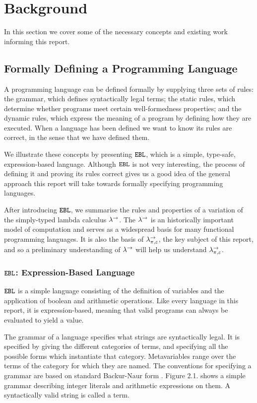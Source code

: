 \chapter{Background}\label{C:background}

In this section we cover some of the necessary concepts and existing work informing this report.

\section{Formally Defining a Programming Language}

A programming language can be defined formally by supplying three sets of rules: the grammar, which defines syntactically legal terms; the static rules, which determine whether programs meet certain well-formedness properties; and the dynamic rules, which express the meaning of a program by defining how they are executed. When a language has been defined we want to know its rules are correct, in the sense that we have defined them.

We illustrate these concepts by presenting $\mathtt{EBL}$, which is a simple, type-safe, expression-based language. Although $\mathtt{EBL}$ is not very interesting, the process of defining it and proving its rules correct gives us a good idea of the general approach this report will take towards formally specifying programming languages.

After introducing $\mathtt{EBL}$, we summarise the rules and properties of a variation of the simply-typed lambda calculus $\lambda^{\rightarrow}$. The $\lambda^{\rightarrow}$ is an historically important model of computation and serves as a widespread basis for many functional programming languages. It is also the basis of $\lambda^{\rightarrow}_{\pi, \varepsilon}$, the key subject of this report, and so a preliminary understanding of $\lambda^{\rightarrow}$ will help us understand $\lambda^{\rightarrow}_{\pi, \varepsilon}$.

\subsection{$\mathtt{EBL}$: Expression-Based Language}

$\mathtt{EBL}$ is a simple language consisting of the definition of variables and the application of boolean and arithmetic operations. Like every language in this report, it is expression-based, meaning that valid programs can always be evaluated to yield a value.

The grammar of a language specifies what strings are syntactically legal. It is specified by giving the different categories of terms, and specifying all the possible forms which instantiate that category. Metavariables range over the terms of the category for which they are named. The conventions for specifying a grammar are based on standard Backur-Naur form \cite{bnf}. Figure 2.1. shows a simple grammar describing integer literals and arithmetic expressions on them. A syntactically valid string is called a term.

